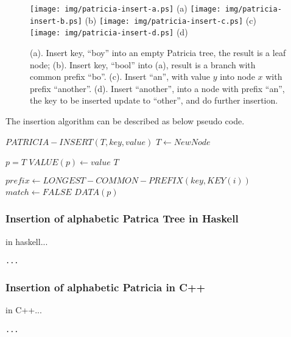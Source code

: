 \documentclass{article}
\begin{document}
\begin{figure}[htbp]
       \begin{center}
	\texttt{[image: img/patricia-insert-a.ps]} (a)
	\texttt{[image: img/patricia-insert-b.ps]} (b)
	\texttt{[image: img/patricia-insert-c.ps]} (c)
	\texttt{[image: img/patricia-insert-d.ps]} (d)
        \caption{(a). Insert key, ``boy'' into an empty Patricia tree,
	the result is a leaf node; \newline
	(b). Insert key, ``bool'' into (a), result is a branch with
	common prefix ``bo''. \newline
        (c). Insert ``an'', with value $y$ into node $x$ with prefix
	``another''. \newline
        (d). Insert ``another'', into a node with prefix ``an'', the key to be inserted update to ``other'', and do further insertion.}
        \label{fig:patricia-insert}
       \end{center}
\end{figure}

The insertion algorithm can be described as below pseudo code.

\begin{algorithmic}
\STATE $PATRICIA-INSERT(T, key, value)$
   \STATE $T \leftarrow NewNode$ \ENDIF

  \STATE $p=T$
  \LOOP
        \STATE $VALUE(p) \leftarrow value$
        \RETURN $T$
      \ENDIF

      \STATE $prefix \leftarrow LONGEST-COMMON-PREFIX(key, KEY(i))$
    \ENDFOR
    \STATE $match \leftarrow FALSE$
  \ENDLOOP
  \RETURN $DATA(p)$
\end{algorithmic}

\subsubsection*{Insertion of alphabetic Patrica Tree in Haskell}
in haskell...

\lstset{language=Haskell}
\begin{lstlisting}
...
\end{lstlisting}

\subsubsection*{Insertion of alphabetic Patricia in C++}
in C++...

\lstset{language=C++}
\begin{lstlisting}
...
\end{lstlisting}
\end{document}
